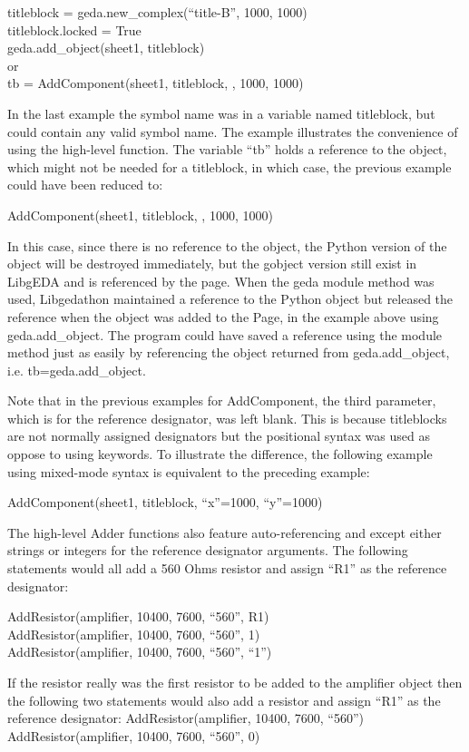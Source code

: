 titleblock = geda.new\_complex(``title-B'', 1000, 1000)\\ 
 titleblock.locked = True\\ 
 geda.add\_object(sheet1, titleblock)\\ 
 or\\ 
tb = AddComponent(sheet1, titleblock, , 1000, 1000)


  In the last example the symbol name was in a variable named titleblock, but could contain any valid symbol name. The example illustrates the convenience of using the high-level function. The variable ``tb'' holds a reference to the object, which might not be needed for a titleblock, in which case, the previous example could have been reduced to:

AddComponent(sheet1, titleblock, , 1000, 1000)


  In this case, since there is no reference to the object, the Python version of the object will be destroyed immediately, but the gobject version still exist in LibgEDA and is referenced by the page. When the geda module method was used, Libgedathon maintained a reference to the Python object but released the reference when the object was added to the Page, in the example above using geda.add\_object. The program could have saved a reference using the module method just as easily by referencing the object returned from geda.add\_object, i.e. tb=geda.add\_object. 


  Note that in the previous examples for AddComponent, the third parameter, which is for the reference designator, was left blank. This is because titleblocks are not normally assigned designators but the positional syntax was used as oppose to using keywords. To illustrate the difference, the following example using mixed-mode syntax is equivalent to the preceding example:

AddComponent(sheet1, titleblock, ``x''=1000, ``y''=1000)


  The high-level Adder functions also feature auto-referencing and except either strings or integers for the reference designator arguments. The following statements would all add a 560 Ohms resistor and assign ``R1'' as the reference designator:

AddResistor(amplifier, 10400, 7600, ``560'', R1)
\\ 
AddResistor(amplifier, 10400, 7600, ``560'', 1)
\\ 
AddResistor(amplifier, 10400, 7600, ``560'', ``1'')


  If the resistor really was the first resistor to be added to the amplifier object then the following two statements would also add a resistor and assign ``R1'' as the reference designator: 
AddResistor(amplifier, 10400, 7600, ``560'')
\\ 
AddResistor(amplifier, 10400, 7600, ``560'', 0)


